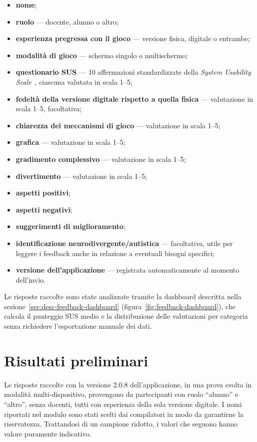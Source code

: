 \documentclass[12pt]{report}
\begin{document}
\begin{itemize}
    \item \textbf{nome};
    \item \textbf{ruolo} --- docente, alunno o altro;
    \item \textbf{esperienza pregressa con il gioco} --- versione fisica, digitale o entrambe;
    \item \textbf{modalità di gioco} --- schermo singolo o multischermo;
    \item \textbf{questionario SUS} --- 10 affermazioni standardizzate della \textit{System Usability Scale}~\cite{brooke1996sus}, ciascuna valutata in scala 1--5;
    \item \textbf{fedeltà della versione digitale rispetto a quella fisica} --- valutazione in scala 1--5, facoltativa;
    \item \textbf{chiarezza dei meccanismi di gioco} --- valutazione in scala 1--5;
    \item \textbf{grafica} --- valutazione in scala 1--5;
    \item \textbf{gradimento complessivo} --- valutazione in scala 1--5;
    \item \textbf{divertimento} --- valutazione in scala 1--5;
    \item \textbf{aspetti positivi};
    \item \textbf{aspetti negativi};
    \item \textbf{suggerimenti di miglioramento};
    \item \textbf{identificazione neurodivergente/autistica} --- facoltativa, utile per leggere i feedback anche in relazione a eventuali bisogni specifici;
    \item \textbf{versione dell'applicazione} --- registrata automaticamente al momento dell'invio.
\end{itemize}

Le risposte raccolte sono state analizzate tramite la dashboard descritta nella sezione~\ref{sec:desc-feedback-dashboard} (figura~\ref{fig:feedback-dashboard}), che calcola il punteggio SUS medio e la distribuzione delle valutazioni per categoria senza richiedere l'esportazione manuale dei dati.

\section{Risultati preliminari}
\label{sec:risultati-preliminari}

Le risposte raccolte con la versione 2.0.8 dell'applicazione, in una prova svolta in modalità multi-dispositivo, provengono da partecipanti con ruolo ``alunno'' e ``altro'', senza docenti, tutti con esperienza della sola versione digitale. I nomi riportati nel modulo sono stati scelti dai compilatori in modo da garantirne la riservatezza. Trattandosi di un campione ridotto, i valori che seguono hanno valore puramente indicativo.
\end{document}
